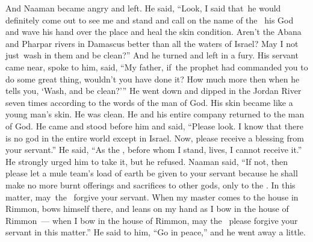 \begin{inparaenum}
   And Naaman became angry and left. He said, ``Look, I said that\understood{}\ he would definitely come out to see me and stand and call on the name of the \lord\ his God and wave his hand over the place and heal the skin condition.%
   Aren't the Abana and Pharpar rivers in Damascus better than all the waters of Israel? May I not just\understood{}\ wash in them and be clean?'' And he turned and left in a fury.%
   His servant came near, spoke to him, said, ``My father, if\understood{}\ the prophet had commanded you to do some great thing, wouldn't you have done it? How much more then when he tells you, `Wash, and be clean?'\thinspace''%
   He went down and dipped in the Jordan River seven times according to the words of the man of God. His skin became like a young man's skin. He was clean.%
   He and his entire company returned to the man of God. He came and stood before him and said, ``Please look. I know that there is no god in the entire world except in Israel. Now, please receive a blessing from your servant.''%
   He said, ``As the \lord, before whom I stand, lives, I cannot receive it.'' He strongly urged him to take it, but he refused.%
   Naaman said, ``If not, then please let a mule team's load of earth be given to your servant because he shall make no more burnt offerings and sacrifices to other gods, only to the \lord.%
   In this matter, may\understood{}\ the \lord\ forgive your servant. When my master comes to the house in Rimmon, bows himself there, and leans on my hand as I bow in the house of Rimmon~--- when I bow in the house of Rimmon, may the \lord\ please forgive your servant in this matter.''%
   He said to him, ``Go in peace,'' and he went away a little.%


\end{inparaenum}

